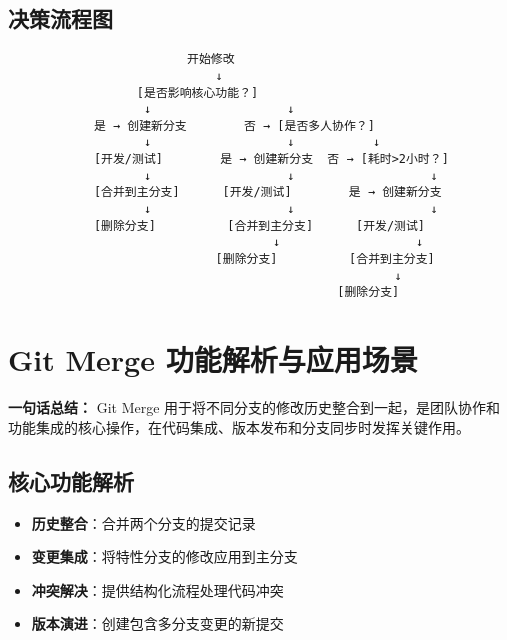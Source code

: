 \subsection{决策流程图}
\begin{verbatim}
                         开始修改
                             ↓
                  [是否影响核心功能？]
                   ↓                   ↓
            是 → 创建新分支        否 → [是否多人协作？]
                   ↓                   ↓           ↓
            [开发/测试]        是 → 创建新分支  否 → [耗时>2小时？]
                   ↓                   ↓                   ↓
            [合并到主分支]      [开发/测试]        是 → 创建新分支
                   ↓                   ↓                   ↓
            [删除分支]          [合并到主分支]      [开发/测试]
                                     ↓                   ↓
                             [删除分支]          [合并到主分支]
                                                      ↓
                                              [删除分支]
\end{verbatim}

\clearpage

\section{Git Merge 功能解析与应用场景}
\textbf{一句话总结：}  
Git Merge 用于将不同分支的修改历史整合到一起，是团队协作和功能集成的核心操作，在代码集成、版本发布和分支同步时发挥关键作用。

\subsection{核心功能解析}
\begin{itemize}[leftmargin=*, nosep]
    \item \textbf{历史整合}：合并两个分支的提交记录
    \item \textbf{变更集成}：将特性分支的修改应用到主分支
    \item \textbf{冲突解决}：提供结构化流程处理代码冲突
    \item \textbf{版本演进}：创建包含多分支变更的新提交
\end{itemize}

